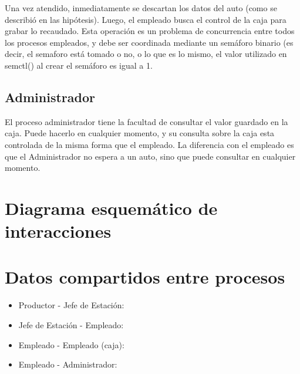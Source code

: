 \documentclass[12pt,a4paper,spanish]{article}
\begin{document}
	Una vez atendido, inmediatamente se descartan los datos del auto (como se describió en las hipótesis). Luego, el empleado busca el control de la caja para grabar lo recaudado. Esta operación es un problema de concurrencia entre todos los procesos empleados, y debe ser coordinada mediante un semáforo binario (es decir, el semaforo está tomado o no, o lo que es lo mismo, el valor utilizado en semctl() al crear el semáforo es igual a 1.
	
	\subsection{Administrador}
	
	El proceso administrador tiene la facultad de consultar el valor guardado en la caja. Puede hacerlo en cualquier momento, y su consulta sobre la caja esta controlada de la misma forma que el empleado. La diferencia con el empleado es que el Administrador no espera a un auto, sino que puede consultar en cualquier momento.
	
	\section{Diagrama esquemático de interacciones}
	
	\section{Datos compartidos entre procesos}
	
	\begin{itemize}
	
	\item Productor - Jefe de Estación:
	
	\item Jefe de Estación - Empleado:
	
	\item Empleado - Empleado (caja):
	
	\item Empleado - Administrador:
	
	\end{itemize}
\end{document}
